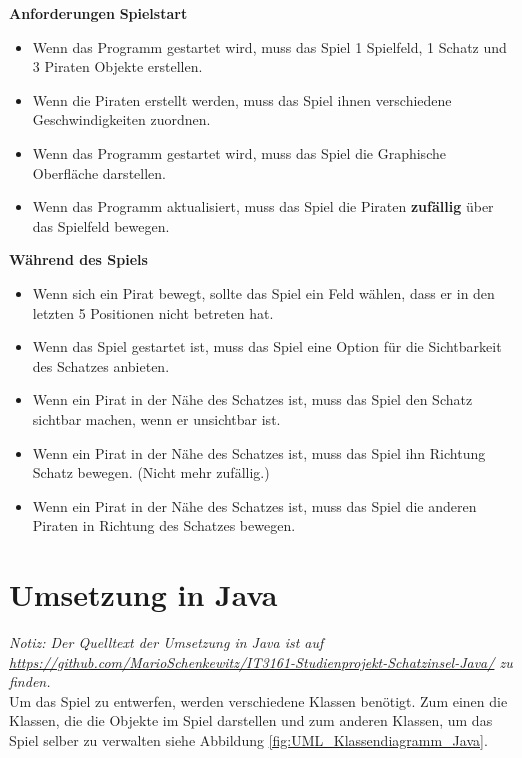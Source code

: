 \documentclass[
	12pt, %
	a4paper,
	listof=totoc, %
	bibliography=totoc, %
	numbers=noenddot, %
	ngerman, %
	headsepline, %
	oneside %
	]{scrbook} %
\begin{document}
\textbf{Anforderungen}
\textbf{Spielstart}
\begin{itemize}\vspace{-1em}
\setlength{\itemsep}{-1em}
	\item Wenn das Programm gestartet wird, muss das Spiel 1 Spielfeld, 1 Schatz und 3 Piraten Objekte erstellen.
	\item Wenn die Piraten erstellt werden, muss das Spiel ihnen verschiedene Geschwindigkeiten zuordnen.
	\item Wenn das Programm gestartet wird, muss das Spiel die Graphische Oberfläche darstellen.
	\item Wenn das Programm aktualisiert, muss das Spiel die Piraten \textbf{zufällig} über das Spielfeld bewegen.
\end{itemize}

\textbf{Während des Spiels}
\begin{itemize}\vspace{-1em}
\setlength{\itemsep}{-1em}
	\item Wenn sich ein Pirat bewegt, sollte das Spiel ein Feld wählen, dass er in den letzten 5 Positionen nicht betreten hat.
	\item Wenn das Spiel gestartet ist, muss das Spiel eine Option für die Sichtbarkeit des Schatzes anbieten.
	\item Wenn ein Pirat in der Nähe des Schatzes ist, muss das Spiel den Schatz sichtbar machen, wenn er unsichtbar ist.
	\item Wenn ein Pirat in der Nähe des Schatzes ist, muss das Spiel ihn Richtung Schatz bewegen. (Nicht mehr zufällig.)
	\item Wenn ein Pirat in der Nähe des Schatzes ist, muss das Spiel die anderen Piraten in Richtung des Schatzes bewegen.
\end{itemize}

\section{Umsetzung in Java}\label{sec:Umsetzung_Java}
\emph{Notiz: Der Quelltext der Umsetzung in Java ist auf \url{https://github.com/MarioSchenkewitz/IT3161-Studienprojekt-Schatzinsel-Java/} zu finden.}\\

Um das Spiel zu entwerfen, werden verschiedene Klassen benötigt. Zum einen die Klassen, die die Objekte im Spiel darstellen und zum anderen Klassen, um das Spiel selber zu verwalten siehe Abbildung \ref{fig:UML_Klassendiagramm_Java}.
\end{document}
